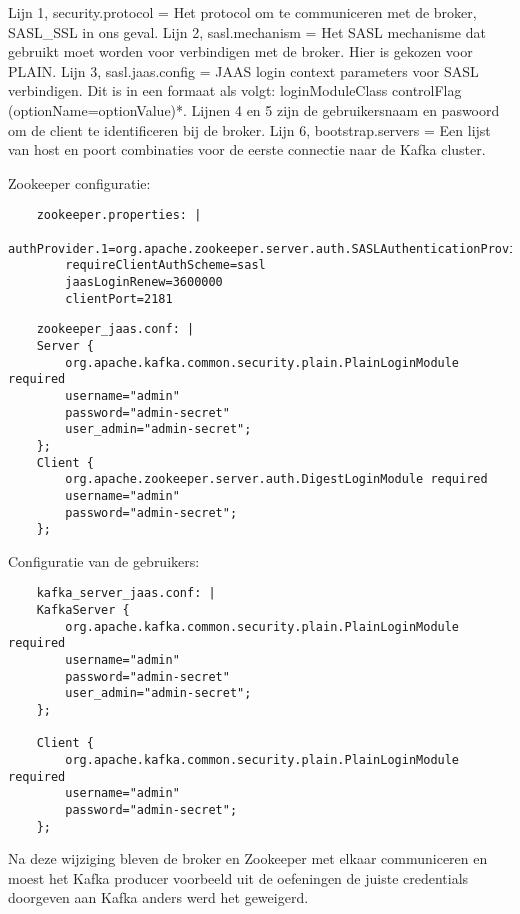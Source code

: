 Lijn 1, security.protocol = Het protocol om te communiceren met de broker, SASL\_SSL in ons geval.
\newline
Lijn 2, sasl.mechanism = Het SASL mechanisme dat gebruikt moet worden voor verbindigen met de broker. Hier is gekozen voor PLAIN.
\newline
Lijn 3, sasl.jaas.config = JAAS login context parameters voor SASL verbindigen. Dit is in een formaat als volgt: loginModuleClass controlFlag (optionName=optionValue)*.
\newline
Lijnen 4 en 5 zijn de gebruikersnaam en paswoord om de client te identificeren bij de broker.
\newline
Lijn 6, bootstrap.servers = Een lijst van host en poort combinaties voor de eerste connectie naar de Kafka cluster.
\newline

Zookeeper configuratie:
\begin{lstlisting}
    zookeeper.properties: |
        authProvider.1=org.apache.zookeeper.server.auth.SASLAuthenticationProvider
        requireClientAuthScheme=sasl
        jaasLoginRenew=3600000
        clientPort=2181
\end{lstlisting}

\begin{lstlisting}
    zookeeper_jaas.conf: |
    Server {
        org.apache.kafka.common.security.plain.PlainLoginModule required
        username="admin"
        password="admin-secret"
        user_admin="admin-secret";
    };
    Client {
        org.apache.zookeeper.server.auth.DigestLoginModule required
        username="admin"
        password="admin-secret";
    };
\end{lstlisting}

Configuratie van de gebruikers:
\begin{lstlisting}
    kafka_server_jaas.conf: |
    KafkaServer {
        org.apache.kafka.common.security.plain.PlainLoginModule required
        username="admin"
        password="admin-secret"
        user_admin="admin-secret";
    };
    
    Client {
        org.apache.kafka.common.security.plain.PlainLoginModule required
        username="admin"
        password="admin-secret";
    };
\end{lstlisting}

Na deze wijziging bleven de broker en Zookeeper met elkaar communiceren en moest het Kafka producer voorbeeld uit de oefeningen de juiste credentials doorgeven aan Kafka anders werd het geweigerd.

